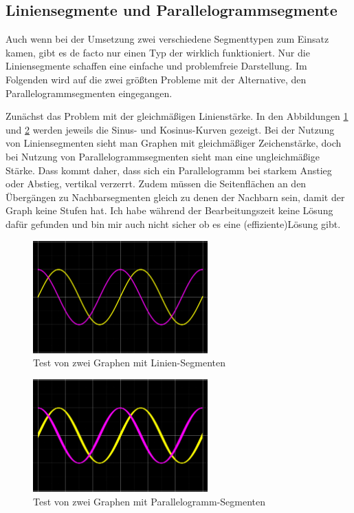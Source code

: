\subsection{Liniensegmente und Parallelogrammsegmente}
\label{sec:line-parallel}
Auch wenn bei der Umsetzung zwei verschiedene Segmenttypen zum Einsatz kamen, gibt es de facto nur einen Typ der wirklich funktioniert.
Nur die Liniensegmente schaffen eine einfache und problemfreie Darstellung.
Im Folgenden wird auf die zwei größten Probleme mit der Alternative, den Parallelogrammsegmenten eingegangen.
\par
Zunächst das Problem mit der gleichmäßigen Linienstärke.
In den Abbildungen \ref{fig:linie-graph2} und \ref{fig:parallelogramm-graph2} werden jeweils die Sinus- und Kosinus-Kurven gezeigt.
Bei der Nutzung von Liniensegmenten sieht man Graphen mit gleichmäßiger Zeichenstärke, doch bei Nutzung von Parallelogrammsegmenten sieht man eine ungleichmäßige Stärke.
Dass kommt daher, dass sich ein Parallelogramm bei starkem Anstieg oder Abstieg, vertikal verzerrt.
Zudem müssen die Seitenflächen an den Übergängen zu Nachbarsegmenten gleich zu denen der Nachbarn sein, damit der Graph keine Stufen hat.
Ich habe während der Bearbeitungszeit keine Lösung dafür gefunden und bin mir auch nicht sicher ob es eine (effiziente)Lösung gibt.
\begin{figure}[ht]
	\centering
	\includegraphics[width=0.6\textwidth]{fig/linie-graph2.png}
	\caption{Test von zwei Graphen mit Linien-Segmenten}
	\label{fig:linie-graph2}
\end{figure}
\FloatBarrier
\begin{figure}[ht]
	\centering
	\includegraphics[width=0.6\textwidth]{fig/parallelogramm-graph2.png}
	\caption{Test von zwei Graphen mit Parallelogramm-Segmenten}
	\label{fig:parallelogramm-graph2}
\end{figure}
